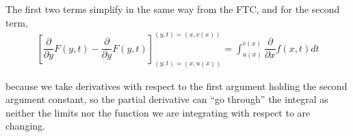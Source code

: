 \documentclass{article}
\begin{document}
\begin{enumerate}[1.]
    The first two terms simplify in the same way from the FTC, and for the second term,
    \begin{align*}
      \left[
        \dfrac{\partial}{\partial y}
        F(y, t)
        -
        \dfrac{\partial}{\partial y}
        F(y, t)
      \right]_{(y, t) = (x, u(x))}^{(y, t) = (x, v(x))}
      =
      \int_{u(x)}^{v(x)} 
      \dfrac{\partial}{\partial x} f(x, t) dt
    \end{align*}

    because we take derivatives with respect to the first argument holding the second argument constant, so the partial derivative can ``go through'' the integral as neither the limits nor the function we are integrating with respect to are changing.
\end{enumerate}

\end{document}
